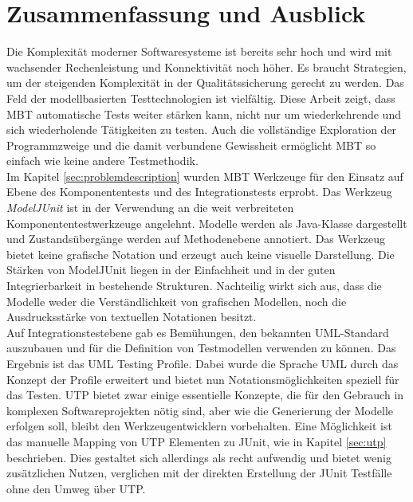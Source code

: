 \section{Zusammenfassung und Ausblick}
\label{sec:conclusion}
Die Komplexität moderner Softwaresysteme ist bereits sehr hoch und wird mit wachsender Rechenleistung und Konnektivität noch höher. Es braucht Strategien, um der steigenden Komplexität in der Qualitätssicherung gerecht zu werden. Das Feld der modellbasierten Testtechnologien ist vielfältig. Diese Arbeit zeigt, dass \Gls{MBT} automatische Tests weiter stärken kann, nicht nur um wiederkehrende und sich wiederholende Tätigkeiten zu testen. Auch die vollständige Exploration der Programmzweige und die damit verbundene Gewissheit ermöglicht \Gls{MBT} so einfach wie keine andere Testmethodik.\\
Im Kapitel \ref{sec:problemdescription}  wurden \Gls{MBT} Werkzeuge für den Einsatz auf Ebene des Komponententests und des Integrationstests erprobt. Das Werkzeug \textit{ModelJUnit} ist in der Verwendung an die weit verbreiteten Komponententestwerkzeuge angelehnt. Modelle werden als Java-Klasse dargestellt und Zustandsübergänge werden auf Methodenebene annotiert. Das Werkzeug bietet keine grafische Notation und erzeugt auch keine visuelle Darstellung. Die Stärken von ModelJUnit liegen in der Einfachheit und in der guten Integrierbarkeit in bestehende Strukturen. Nachteilig wirkt sich aus, dass die Modelle weder die Verständlichkeit von grafischen Modellen, noch die Ausdrucksstärke von textuellen Notationen besitzt.\\
Auf Integrationstestebene gab es Bemühungen, den bekannten UML-Standard auszubauen und für die Definition von Testmodellen verwenden zu können. Das Ergebnis ist das UML Testing Profile. Dabei wurde die Sprache UML durch das Konzept der Profile erweitert und bietet nun Notationsmöglichkeiten speziell für das Testen. UTP bietet zwar einige essentielle Konzepte, die für den Gebrauch in komplexen Softwareprojekten nötig sind, aber wie die Generierung der Modelle erfolgen soll, bleibt den Werkzeugentwicklern vorbehalten. Eine Möglichkeit ist das manuelle Mapping von UTP Elementen zu JUnit, wie in Kapitel \ref{sec:utp} beschrieben. Dies gestaltet sich allerdings als recht aufwendig und bietet wenig zusätzlichen Nutzen, verglichen mit der direkten Erstellung der JUnit Testfälle ohne den Umweg über UTP.\\
